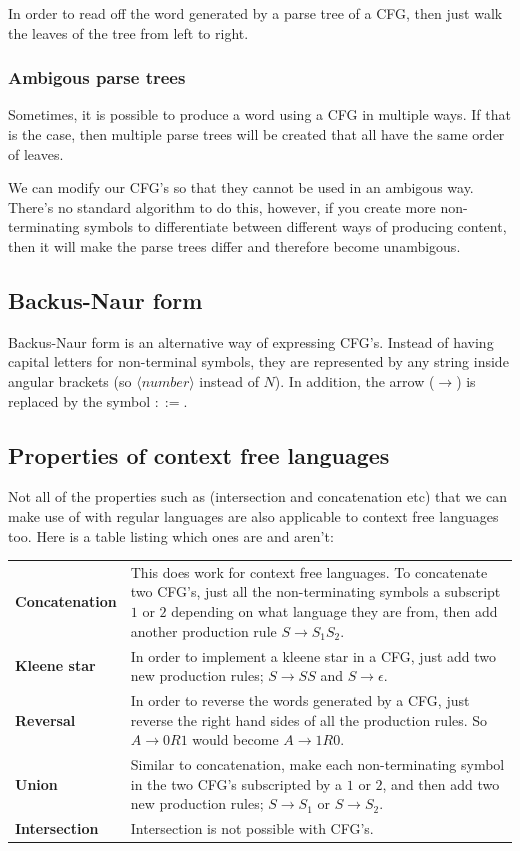 In order to read off the word generated by a parse tree of a CFG, then just walk
the leaves of the tree from left to right.

\subsubsection{Ambigous parse trees}

Sometimes, it is possible to produce a word using a CFG in multiple ways. If
that is the case, then multiple parse trees will be created that all have the
same order of leaves.

We can modify our CFG's so that they cannot be used in an ambigous way. There's
no standard algorithm to do this, however, if you create more non-terminating
symbols to differentiate between different ways of producing content, then it
will make the parse trees differ and therefore become unambigous.


\subsection{Backus-Naur form}

Backus-Naur form is an alternative way of expressing CFG's. Instead of having
capital letters for non-terminal symbols, they are represented by any string
inside angular brackets (so $\langle number \rangle$ instead of $N$). In
addition, the arrow ($\rightarrow$) is replaced by the symbol $::=$.

\subsection{Properties of context free languages}

Not all of the properties such as (intersection and concatenation etc) that we
can make use of with regular languages are also applicable to context free
languages too. Here is a table listing which ones are and aren't:

\begin{tabularx}{\textwidth}{>{\bfseries}l|X}
	Concatenation & This does work for context free languages. To concatenate
					two CFG's, just all the non-terminating symbols a
					subscript $1$ or $2$ depending on what language they are
					from, then add another production rule 
					$S \rightarrow S_1S_2$.\\
	Kleene star   & In order to implement a kleene star in a CFG, just add two
					new production rules; $S \rightarrow SS$ and $S \rightarrow
					\epsilon$.\\
	Reversal      & In order to reverse the words generated by a CFG, just 
					reverse the right hand sides of all the production rules. 
					So $A \rightarrow 0R1$ would become $A \rightarrow 1R0$.\\
	Union         & Similar to concatenation, make each non-terminating symbol
					in the two CFG's subscripted by a $1$ or $2$, and then add
					two new production rules; $S \rightarrow S_1$ or
					$S \rightarrow S_2$.\\
	Intersection  & Intersection is not possible with CFG's.
\end{tabularx}
